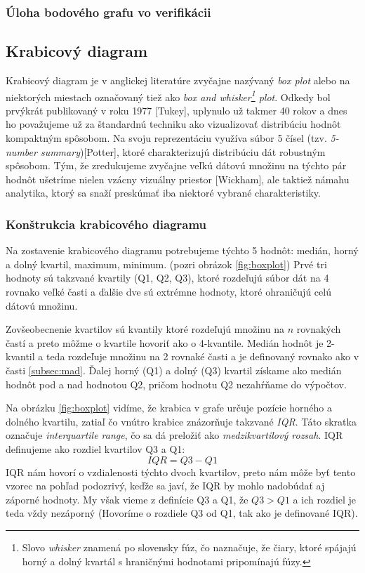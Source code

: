 \subsubsection{Úloha bodového grafu vo verifikácii}


\subsection{Krabicový diagram}
Krabicový diagram je v anglickej literatúre zvyčajne nazývaný \textit{box plot} alebo na niektorých miestach označovaný tiež ako \textit{box and whisker\footnote{Slovo \textit{whisker} znamená po slovensky fúz, čo naznačuje, že čiary, ktoré spájajú horný a dolný kvartál s hraničnými hodnotami pripomínajú fúzy.} plot}. Odkedy bol prvýkrát publikovaný v roku 1977 [Tukey], uplynulo už takmer 40 rokov a dnes ho považujeme už za štandardnú techniku ako vizualizovať distribúciu hodnôt kompaktným spôsobom. Na svoju reprezentáciu využíva súbor 5 čísel (tzv. \textit{5-number summary})[Potter], ktoré charakterizujú distribúciu dát robustným spôsobom. Tým, že zredukujeme zvyčajne veľkú dátovú množinu na týchto pár hodnôt ušetríme nielen vzácny vizuálny priestor [Wickham], ale taktiež námahu analytika, ktorý sa snaží preskúmať iba niektoré vybrané charakteristiky. 

\subsubsection{Konštrukcia krabicového diagramu}

Na zostavenie krabicového diagramu potrebujeme týchto 5 hodnôt: medián, horný a dolný kvartil, maximum, minimum. (pozri obrázok \ref{fig:boxplot}) Prvé tri hodnoty sú takzvané kvartily (Q1, Q2, Q3), ktoré rozdeľujú súbor dát na 4 rovnako veľké časti a ďalšie dve sú extrémne hodnoty, ktoré ohraničujú celú dátovú množinu. 

Zovšeobecnenie kvartilov sú kvantily ktoré rozdeľujú množinu na $n$ rovnakých častí a preto môžme o kvartile hovoriť ako o 4-kvantile. Medián hodnôt je 2-kvantil a teda rozdeľuje množinu na 2 rovnaké časti a je definovaný rovnako ako v časti \ref{subsec:mad}. Ďalej horný (Q1) a dolný (Q3) kvartil získame ako medián hodnôt pod a nad hodnotou Q2, pričom hodnotu Q2 nezahŕňame do výpočtov. 

Na obrázku \ref{fig:boxplot} vidíme, že krabica v grafe určuje pozície horného a dolného kvartilu, zatiaľ čo vnútro krabice znázorňuje takzvané \textit{IQR}. Táto skratka označuje \textit{interquartile range}, čo sa dá preložiť ako \textit{medzikvartilový rozsah}. IQR definujeme ako rozdiel kvartilov Q3 a Q1:
\[
	IQR = Q3 - Q1
\]
IQR nám hovorí o vzdialenosti týchto dvoch kvartilov, preto nám môže byť tento vzorec na pohľad podozrivý, keďže sa javí, že IQR by mohlo nadobúdať aj záporné hodnoty. My však vieme z definície Q3 a Q1, že $ Q3 > Q1 $ a ich rozdiel je teda vždy nezáporný (Hovoríme o rozdiele Q3 od Q1, tak ako je definované IQR).

